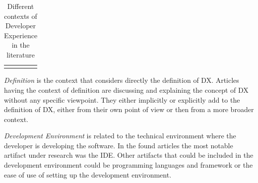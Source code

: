 \documentclass[english, 12pt, a4paper, sci, utf8, a-1b, online]{aaltothesis}
\begin{document}
\begin{center}
\begin{longtable}{p{0.3\linewidth}p{0.6\linewidth}}
    \caption{Different contexts of Developer Experience in the literature}                                                                                                                                                                                                                                                                                                                                                                                                                                                                                                                                                                                                                                                                                                                                                                                                              \\
    \label{table:context}                                                                                                                                                                                                                                                                                                                                                                                                                                                                                                                                                                                                                                                                                                                                                                                                                                                               \\
  \end{longtable}
\end{center}
\renewcommand{\arraystretch}{1}


\textit{Definition} is the context that considers directly the definition of DX. Articles having the context of definition are discussing and explaining the concept of DX without any specific viewpoint. They either implicitly or explicitly add to the definition of DX, either from their own point of view or then from a more broader context.

\textit{Development Environment} is related to the technical environment where the developer is developing the software. In the found articles the most notable artifact under research was the IDE. Other artifacts that could be included in the development environment could be programming languages and framework or the ease of use of setting up the development environment.
\end{document}
